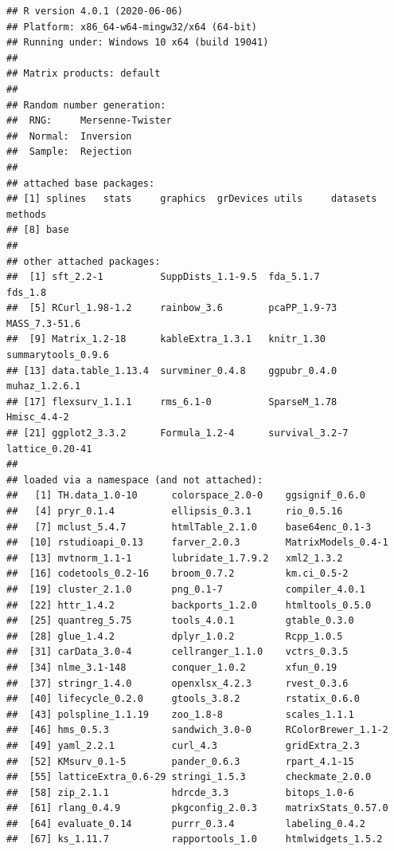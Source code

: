 \documentclass[]{article}
\begin{document}
\begin{verbatim}
## R version 4.0.1 (2020-06-06)
## Platform: x86_64-w64-mingw32/x64 (64-bit)
## Running under: Windows 10 x64 (build 19041)
## 
## Matrix products: default
## 
## Random number generation:
##  RNG:     Mersenne-Twister 
##  Normal:  Inversion 
##  Sample:  Rejection 
##  
## attached base packages:
## [1] splines   stats     graphics  grDevices utils     datasets  methods  
## [8] base     
## 
## other attached packages:
##  [1] sft_2.2-1          SuppDists_1.1-9.5  fda_5.1.7          fds_1.8           
##  [5] RCurl_1.98-1.2     rainbow_3.6        pcaPP_1.9-73       MASS_7.3-51.6     
##  [9] Matrix_1.2-18      kableExtra_1.3.1   knitr_1.30         summarytools_0.9.6
## [13] data.table_1.13.4  survminer_0.4.8    ggpubr_0.4.0       muhaz_1.2.6.1     
## [17] flexsurv_1.1.1     rms_6.1-0          SparseM_1.78       Hmisc_4.4-2       
## [21] ggplot2_3.3.2      Formula_1.2-4      survival_3.2-7     lattice_0.20-41   
## 
## loaded via a namespace (and not attached):
##   [1] TH.data_1.0-10      colorspace_2.0-0    ggsignif_0.6.0     
##   [4] pryr_0.1.4          ellipsis_0.3.1      rio_0.5.16         
##   [7] mclust_5.4.7        htmlTable_2.1.0     base64enc_0.1-3    
##  [10] rstudioapi_0.13     farver_2.0.3        MatrixModels_0.4-1 
##  [13] mvtnorm_1.1-1       lubridate_1.7.9.2   xml2_1.3.2         
##  [16] codetools_0.2-16    broom_0.7.2         km.ci_0.5-2        
##  [19] cluster_2.1.0       png_0.1-7           compiler_4.0.1     
##  [22] httr_1.4.2          backports_1.2.0     htmltools_0.5.0    
##  [25] quantreg_5.75       tools_4.0.1         gtable_0.3.0       
##  [28] glue_1.4.2          dplyr_1.0.2         Rcpp_1.0.5         
##  [31] carData_3.0-4       cellranger_1.1.0    vctrs_0.3.5        
##  [34] nlme_3.1-148        conquer_1.0.2       xfun_0.19          
##  [37] stringr_1.4.0       openxlsx_4.2.3      rvest_0.3.6        
##  [40] lifecycle_0.2.0     gtools_3.8.2        rstatix_0.6.0      
##  [43] polspline_1.1.19    zoo_1.8-8           scales_1.1.1       
##  [46] hms_0.5.3           sandwich_3.0-0      RColorBrewer_1.1-2 
##  [49] yaml_2.2.1          curl_4.3            gridExtra_2.3      
##  [52] KMsurv_0.1-5        pander_0.6.3        rpart_4.1-15       
##  [55] latticeExtra_0.6-29 stringi_1.5.3       checkmate_2.0.0    
##  [58] zip_2.1.1           hdrcde_3.3          bitops_1.0-6       
##  [61] rlang_0.4.9         pkgconfig_2.0.3     matrixStats_0.57.0 
##  [64] evaluate_0.14       purrr_0.3.4         labeling_0.4.2     
##  [67] ks_1.11.7           rapportools_1.0     htmlwidgets_1.5.2  

\end{verbatim}
\end{document}
